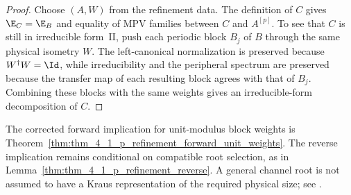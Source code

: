 \begin{proof}\leanok
    Choose $(A,W)$ from the refinement data. The definition of $C$ gives
    $\E_C = \E_B$ and equality of MPV families between $C$
    and $A^{[p]}$. To see that $C$ is still in irreducible form~II, push
    each periodic block $B_j$ of $B$ through the same physical isometry $W$.
    The left-canonical normalization is preserved because
    $W^\dagger W = \Id$,
    while irreducibility and the peripheral spectrum are preserved because the
    transfer map of each resulting block agrees with that of $B_j$.
    Combining these blocks with the same weights gives an
    irreducible-form decomposition of $C$.
\end{proof}

The corrected forward implication for unit-modulus block weights is
Theorem~\ref{thm:thm_4_1_p_refinement_forward_unit_weights}. The reverse
implication remains conditional on compatible root selection, as in
Lemma~\ref{thm:thm_4_1_p_refinement_reverse}. A general channel root is
not assumed to have a Kraus representation of the required physical size;
see \cite{gap:dccsp17_root_kraus_rank_thm41}.

